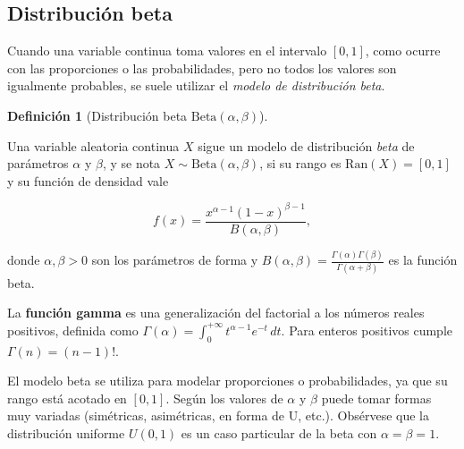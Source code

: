\documentclass[
  spanish,
  a4paper,
]{scrreport}
\theoremstyle{plain}
\theoremstyle{definition}
\theoremstyle{definition}
\newtheorem{definition}{Definición}[chapter]
\theoremstyle{remark}
\begin{document}
\subsection{Distribución beta}\label{distribuciuxf3n-beta}

Cuando una variable continua toma valores en el intervalo \([0,1]\),
como ocurre con las proporciones o las probabilidades, pero no todos los
valores son igualmente probables, se suele utilizar el \emph{modelo de
distribución beta}.

\begin{definition}[Distribución beta
\(\mbox{Beta}(\alpha,\beta)\)]\protect\hypertarget{def-distribucion-beta}{}\label{def-distribucion-beta}

Una variable aleatoria continua \(X\) sigue un modelo de distribución
\emph{beta} de parámetros \(\alpha\) y \(\beta\), y se nota
\(X\sim \mbox{Beta}(\alpha,\beta)\), si su rango es
\(\mbox{Ran}(X)=[0,1]\) y su función de densidad vale

\[
f(x) = \frac{x^{\alpha-1}(1-x)^{\beta-1}}{B(\alpha,\beta)},
\]

donde \(\alpha, \beta>0\) son los parámetros de forma y
\(B(\alpha,\beta)=\frac{\Gamma(\alpha)\Gamma(\beta)}{\Gamma(\alpha+\beta)}\)
es la función beta.

\end{definition}

\begin{tcolorbox}[enhanced jigsaw, arc=.35mm, bottomrule=.15mm, bottomtitle=1mm, breakable, colback=white, colbacktitle=quarto-callout-note-color!10!white, colframe=quarto-callout-note-color-frame, coltitle=black, left=2mm, leftrule=.75mm, opacityback=0, opacitybacktitle=0.6, rightrule=.15mm, title=\textcolor{quarto-callout-note-color}{\faInfo}\hspace{0.5em}{Nota}, titlerule=0mm, toprule=.15mm, toptitle=1mm]

La \textbf{función gamma} es una generalización del factorial a los
números reales positivos, definida como
\(\Gamma(\alpha) = \int_0^{+\infty} t^{\alpha-1}e^{-t}\,dt\). Para
enteros positivos cumple \(\Gamma(n) = (n-1)!\).

\end{tcolorbox}

El modelo beta se utiliza para modelar proporciones o probabilidades, ya
que su rango está acotado en \([0,1]\). Según los valores de \(\alpha\)
y \(\beta\) puede tomar formas muy variadas (simétricas, asimétricas, en
forma de U, etc.). Obsérvese que la distribución uniforme \(U(0,1)\) es
un caso particular de la beta con \(\alpha=\beta=1\).
\end{document}
